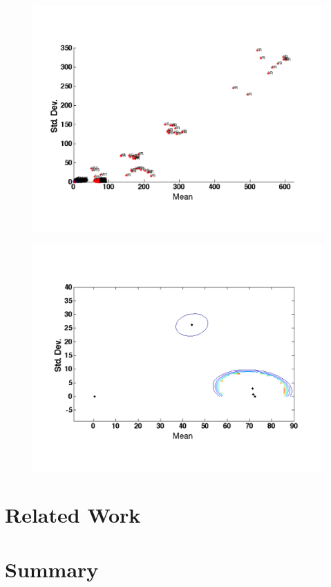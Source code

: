 \begin{figure}[t!] %
\centering
\includegraphics[width=1.0\columnwidth]{figs/VR}
\caption{}
\label{fig:tstreams}
\end{figure}

\begin{figure}[t!] %
\centering
\includegraphics[width=1.0\columnwidth]{figs/gmm_centers}
\caption{}
\label{fig:tstreams}
\end{figure}


\section{Related Work}
\section{Summary}

\

